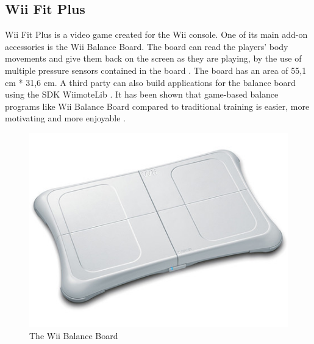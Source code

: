 \subsection{Wii Fit Plus}
Wii Fit Plus is a video game created for the Wii console. One of its main add-on accessories is the Wii Balance Board. The board can read the players' body movements and give them back on the screen as they are playing, by the use of multiple pressure sensors contained in the board \cite{whatiswiifit}. The board has an area of 55,1 cm {*} 31,6 cm. A third party can also build applications for the balance board using the SDK WiimoteLib \cite{comparison}. It has been shown that game-based balance programs like Wii Balance Board compared to traditional training is easier, more motivating and more enjoyable \cite{taylor2011activity}.
\begin{figure}[h!]
\begin{center}
\includegraphics[scale=0.4]{wiibalance}
\caption[Wii Balance Board]{The Wii Balance Board}
\label{fig:WiiBalanceBoard}
\end{center}
\end{figure}

